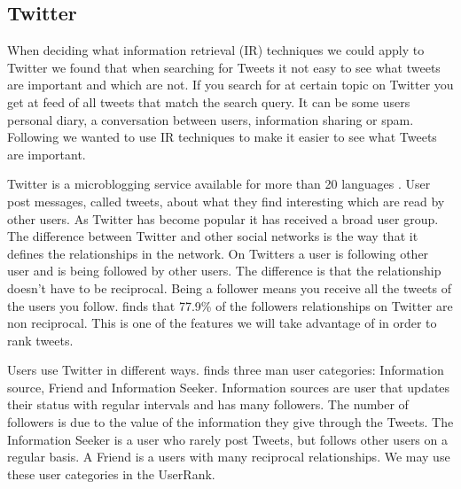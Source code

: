 \subsection{Twitter}

\label{Twitter}

When deciding what information retrieval (IR) techniques we could apply to Twitter we found that when searching for Tweets it not easy to see what tweets are important and which are not. If you search for at certain topic on Twitter you get at feed of all tweets that match the search query. It can be some users personal diary, a conversation between users, information sharing or spam. Following we wanted to use IR techniques to make it easier to see what Tweets are important. 

Twitter is a microblogging service available for more than 20 languages \citep{Twitter2012}. User post messages, called tweets, about what they find interesting which are read by other users. As Twitter has become popular it has received a broad user group. The difference between Twitter and other social networks is the way  that it defines the relationships in the network. On Twitters a user is following other user and is being followed by other users. The difference is that the relationship doesn't have to be reciprocal. Being a follower means you receive all the tweets of the users you follow. \citep{Kwak2010} finds that 77.9\% of the followers relationships on Twitter are non reciprocal. This is one of the features we will take advantage of in order to rank tweets. 

Users use Twitter in different ways. \citet{Akshay2007} finds three man user categories: Information source, Friend and Information Seeker. Information sources are user that updates their status with regular intervals and has many followers. The number of followers is due to the value of the information they give through the Tweets. The Information Seeker is a user who rarely post Tweets, but follows other users on a regular basis. A Friend is a users with many reciprocal relationships. We may use these user categories in the UserRank. 

